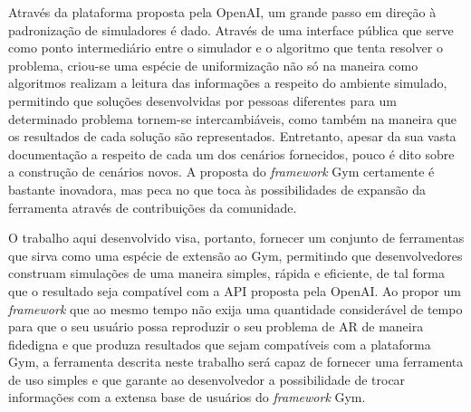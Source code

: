 \documentclass[cic,tc]{iiufrgs}
\begin{document}
Através da plataforma proposta pela OpenAI, um grande passo em direção à
padronização de simuladores é dado. Através de uma interface pública
que serve como ponto
intermediário entre o simulador e o algoritmo que tenta resolver o problema,
criou-se uma espécie de uniformização não só na maneira como algoritmos
realizam a leitura das informações a respeito do ambiente simulado, permitindo que
soluções desenvolvidas por pessoas diferentes para um determinado problema
tornem-se intercambiáveis, como também na maneira que os resultados de cada
solução são representados. Entretanto, apesar da sua vasta documentação
a respeito de cada um dos cenários fornecidos, pouco é dito sobre a construção
de cenários novos. A proposta do \textit{framework} Gym certamente é
bastante inovadora, mas peca no que toca às possibilidades de expansão da
ferramenta através de contribuições da comunidade.


O trabalho aqui desenvolvido visa, portanto, fornecer um conjunto de ferramentas
que sirva como uma espécie de extensão ao Gym, permitindo que desenvolvedores
construam simulações de uma maneira simples, rápida e eficiente, de tal forma
que o resultado seja compatível com a API proposta pela OpenAI. Ao propor um
\textit{framework} que ao mesmo tempo não exija uma quantidade considerável
de tempo para que o seu usuário possa reproduzir o seu problema de AR de
maneira fidedigna e que produza resultados que sejam compatíveis com a
plataforma Gym, a ferramenta descrita neste trabalho será capaz de fornecer uma
ferramenta de uso simples e que garante ao desenvolvedor a possibilidade de
trocar informações com a extensa base de usuários do \textit{framework} Gym.

%
%
%
\end{document}
